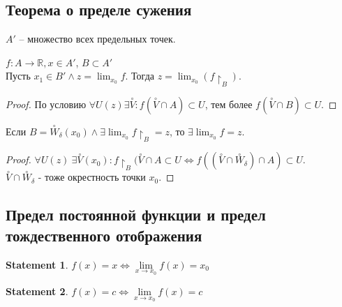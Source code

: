 \documentclass[11pt]{book}
\newcommand{\R}{\mathbb{R}}
\theoremstyle{definition}
\theoremstyle{plain}
\theoremstyle{plain}
\newtheorem*{st}{Statement}
\theoremstyle{definition}
\theoremstyle{remark}
\begin{document}
\subsection{Теорема о пределе сужения}\label{ques_16}
\begin{defn}
    $A'$ -- множество всех предельных точек.
\end{defn}
\begin{thm}
    $f: A \to \R, x \in A'$, $B \subset A'$\\
    Пусть $x_1 \in B' \wedge z = \lim_{x_0} f$. Тогда $z = \lim_{x_0} (f\upharpoonright_B)$.
\end{thm}
\begin{proof}
    По условию $\forall U(z) \exists \stackrel \circ V: f(\stackrel \circ V \cap A) \subset U $, тем более $f(\stackrel \circ V \cap B) \subset U$.
\end{proof}
\begin{thm}
    Если $B=\stackrel \circ W_{\delta }(x_0) \wedge \exists \lim_{x_0} f \upharpoonright_B = z$, то $\exists \lim_{x_0} f = z$.
\end{thm}
\begin{proof}
    $\forall U(z) ~\exists \stackrel \circ V(x_0): f\upharpoonright_B(\stackrel \circ V \cap A \subset U \Leftrightarrow f((\stackrel \circ V \cap \stackrel \circ W_{\delta } ) \cap A ) \subset U$.\\
    $\stackrel \circ V \cap \stackrel \circ W_{\delta }$ - тоже окрестность точки $x_0$.
\end{proof}
\subsection{Предел постоянной функции и предел тождественного отображения}\label{ques_17}
\begin{st}
    $f(x) = x \Longleftrightarrow \lim\limits_{x \to x_0} f(x) = x_0$
\end{st}
\begin{st}
    $f(x) = c \Longleftrightarrow \lim\limits_{x \to x_0} f(x) = c$
\end{st}
\end{document}
